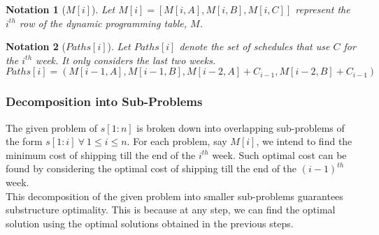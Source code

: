 \documentclass[12pt]{report}
\newtheorem{notation}{Notation}
\begin{document}
    \begin{notation}[$M{[i]}$]
        Let $M{[i]} = [M{[i, A]}, M{[i, B]}, M{[i, C]}]$ represent the $i^{th}$ row of the dynamic programming table, $M$.
    \end{notation}

    \begin{notation}[$Paths{[i]}$]
        Let $Paths{[i]}$ denote the set of schedules that use $C$ for the $i^{th}$ week.
        It only considers the last two weeks.
        $$Paths{[i]} = (M{[i-1, A]}, M{[i-1, B]}, M{[i-2, A]} + C_{i-1}, M{[i-2, B]} + C_{i-1})$$
    \end{notation}

    \subsubsection*{Decomposition into Sub-Problems}
    The given problem of $s[1:n]$ is broken down into overlapping sub-problems of the form $s[1:i] \ \forall \ 1 \le i \le n$.
    For each problem, say $M[i]$, we intend to find the minimum cost of shipping till the end of the $i^{th}$ week.
    Such optimal cost can be found by considering the optimal cost of shipping till the end of the $(i-1)^{th}$ week. \\
    This decomposition of the given problem into smaller sub-problems guarantees substructure optimality.
    This is because at any step, we can find the optimal solution using the optimal solutions obtained in the previous steps.
\end{document}
